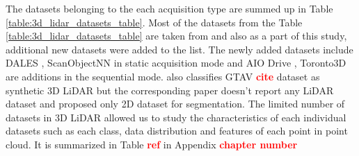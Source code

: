     The datasets belonging to the each acquisition type are summed up in  Table \ref{table:3d_lidar_datasets_table}.
    Most of the datasets from the Table \ref{table:3d_lidar_datasets_table} are taken from \cite{survey3d} and also as a part of this study, additional new datasets were added to the list.
    The newly added datasets include DALES \cite{varney2020dales}, ScanObjectNN \cite{scanobejctnn} in static acquisition mode and AIO Drive \cite{Weng2020_AIODrive}, Toronto3D \cite{tan2020toronto3d} are additions in the sequential mode.
    \cite{survey3d} also classifies GTAV \textcolor{red}{\textbf{cite}} dataset as synthetic 3D LiDAR but the corresponding paper doesn't report any LiDAR dataset and proposed only 2D dataset for segmentation.
    The limited number of datasets in 3D LiDAR allowed us to study the characteristics of each individual datasets such as each class, data distribution and features of each point in point cloud. 
    It is summarized in Table \textcolor{red}{\textbf{ref}} in Appendix \textcolor{red}{\textbf{chapter number}}
    
